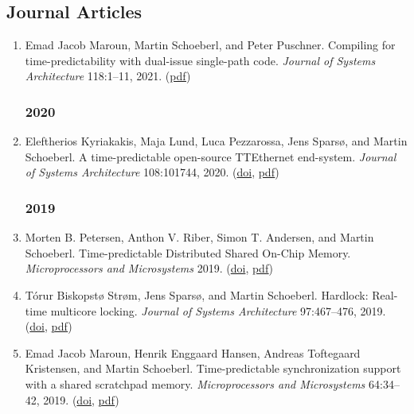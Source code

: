 \subsection*{Journal Articles}

\begin{enumerate}

\subsubsection*{2021}

\item Emad Jacob Maroun, Martin Schoeberl, and Peter Puschner.
 Compiling for time-predictability with dual-issue single-path code.
 \emph{Journal of Systems Architecture} 118:1--11, 2021.
(\href{https://www.jopdesign.com/doc/spvliw-jnl.pdf}{pdf})


\subsubsection*{2020}

\item Eleftherios Kyriakakis, Maja Lund, Luca Pezzarossa, Jens Spars{\o}, and Martin Schoeberl.
 A time-predictable open-source TTEthernet end-system.
 \emph{Journal of Systems Architecture} 108:101744, 2020.
(\href{http://dx.doi.org/https://doi.org/10.1016/j.sysarc.2020.101744}{doi}, \href{https://www.jopdesign.com/doc/ttenode-jnl.pdf}{pdf})


\subsubsection*{2019}

\item Morten B. Petersen, Anthon V. Riber, Simon T. Andersen, and Martin Schoeberl.
 Time-predictable Distributed Shared On-Chip Memory.
 \emph{Microprocessors and Microsystems} 2019.
(\href{http://dx.doi.org/10.1016/j.micpro.2019.102896}{doi}, \href{https://www.jopdesign.com/doc/tpdistmem-jnl.pdf}{pdf})

\item T{\'o}rur Biskopst{\o} Str{\o}m, Jens Spars{\o}, and Martin Schoeberl.
 Hardlock: Real-time multicore locking.
 \emph{Journal of Systems Architecture} 97:467--476, 2019.
(\href{http://dx.doi.org/10.1016/j.sysarc.2019.02.003}{doi}, \href{https://www.jopdesign.com/doc/hardlock-jnl.pdf}{pdf})

\item Emad Jacob Maroun, Henrik Enggaard Hansen, Andreas Toftegaard Kristensen, and Martin Schoeberl.
 Time-predictable synchronization support with a shared scratchpad memory.
 \emph{Microprocessors and Microsystems} 64:34--42, 2019.
(\href{http://dx.doi.org/10.1016/j.micpro.2018.09.014}{doi}, \href{https://www.jopdesign.com/doc/spmsync-jnl.pdf}{pdf})



\end{enumerate}
